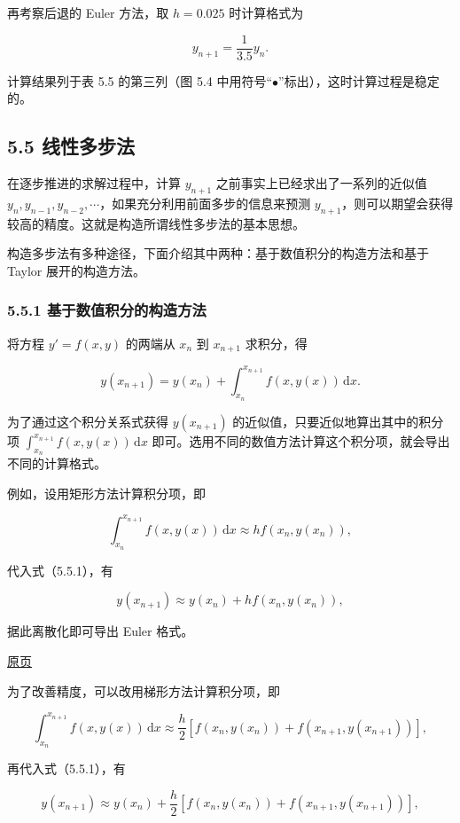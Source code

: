 \documentclass[
  10pt,
  fontset=fandol]{ctexart}
\begin{document}
再考察后退的 Euler 方法，取 \(h=0.025\) 时计算格式为

\[
y_{n+1}=\frac{1}{3.5}y_n.
\]

计算结果列于表 5.5 的第三列（图 5.4 中用符号``\(\bullet\)''标出），这时计算过程是稳定的。

\subsection{5.5 线性多步法}\label{ux7ebfux6027ux591aux6b65ux6cd5}

在逐步推进的求解过程中，计算 \(y_{n+1}\) 之前事实上已经求出了一系列的近似值 \(y_n,y_{n-1},y_{n-2},\cdots\)，如果充分利用前面多步的信息来预测 \(y_{n+1}\)，则可以期望会获得较高的精度。这就是构造所谓线性多步法的基本思想。

构造多步法有多种途径，下面介绍其中两种：基于数值积分的构造方法和基于 Taylor 展开的构造方法。

\subsubsection{5.5.1 基于数值积分的构造方法}\label{ux57faux4e8eux6570ux503cux79efux5206ux7684ux6784ux9020ux65b9ux6cd5}

将方程 \(y'=f(x,y)\) 的两端从 \(x_n\) 到 \(x_{n+1}\) 求积分，得

\[
y(x_{n+1})=y(x_n)+\int_{x_n}^{x_{n+1}}f(x,y(x))\,\mathrm dx.
\tag{5.5.1}
\]

为了通过这个积分关系式获得 \(y(x_{n+1})\) 的近似值，只要近似地算出其中的积分项 \(\int_{x_n}^{x_{n+1}}f(x,y(x))\,\mathrm dx\) 即可。选用不同的数值方法计算这个积分项，就会导出不同的计算格式。

例如，设用矩形方法计算积分项，即

\[
\int_{x_n}^{x_{n+1}}f(x,y(x))\,\mathrm dx\approx hf(x_n,y(x_n)),
\]

代入式（5.5.1），有

\[
y(x_{n+1})\approx y(x_n)+hf(x_n,y(x_n)),
\]

据此离散化即可导出 Euler 格式。

\href{../../source-images/pdf-138.jpeg}{原页}

为了改善精度，可以改用梯形方法计算积分项，即

\[
\int_{x_n}^{x_{n+1}}f(x,y(x))\,\mathrm dx\approx\frac h2[f(x_n,y(x_n))+f(x_{n+1},y(x_{n+1}))],
\]

再代入式（5.5.1），有

\[
y(x_{n+1})\approx y(x_n)+\frac h2[f(x_n,y(x_n))+f(x_{n+1},y(x_{n+1}))],
\]
\end{document}
